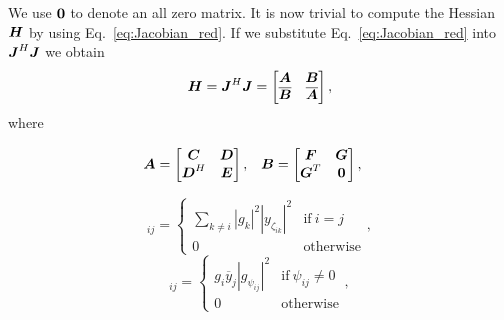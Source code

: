 \documentclass[useAMS,usenatbib]{mn2e}
\newcommand{\bA}{\bmath{A}}
\newcommand{\bB}{\bmath{B}}
\newcommand{\bC}{\bmath{C}}
\newcommand{\bE}{\bmath{E}}
\newcommand{\bF}{\bmath{F}}
\newcommand{\bG}{\bmath{G}}
\newcommand{\bJ}{\bmath{J}}
\newcommand{\bD}{\bmath{D}}
\newcommand{\bH}{\bmath{H}}
\newcommand{\bN}{\bmath{N}}
\newcommand{\bM}{\bmath{M}}
\newcommand{\bzero}{\bmath{0}}
\newcommand{\conj}[1]{\overline{#1}}
\begin{document}
We use $\bzero$ to denote an all zero matrix. It is now trivial to compute the Hessian $\bH$ by using Eq.~\eqref{eq:Jacobian_red}. If we substitute Eq.~\eqref{eq:Jacobian_red} into $\bJ^H\bJ$
we obtain 
\begin{equation}
\label{eq:red_H}
\bH = \bJ^H\bJ = 
\begin{bmatrix}
\bA & \bB\\
\conj{\bB} & \conj{\bA}
\end{bmatrix},
\end{equation}
where

\begin{align}
\bA &= \begin{bmatrix} \bC & \bD\\ \bD^H & \bE \end{bmatrix}, & \bB &= \begin{bmatrix} \bF & \bG\\ \bG^T & \bzero \end{bmatrix},
\end{align}

\begin{equation}
[\bC]_{ij} = 
\begin{cases}
 \sum_{k \neq i} \left | g_k \right |^2 \left | y_{\zeta_{ik}} \right |^2 & \textrm{if} ~ i=j\\
 0 & \textrm{otherwise}
\end{cases},
\end{equation}
\begin{equation}
[\bD]_{ij} = 
\begin{cases}
 g_i \conj{y}_j  \left | g_{\psi_{ij}} \right |^2  & \textrm{if} ~ \psi_{ij}\neq0\\
 0 & \textrm{otherwise}
\end{cases},
\end{equation}
\end{document}

